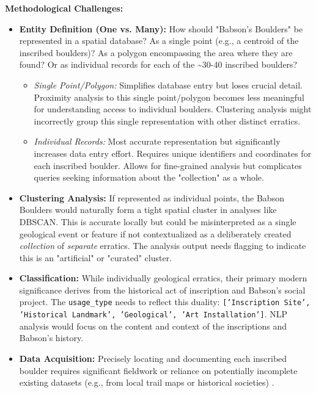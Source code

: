 \textbf{Methodological Challenges:}
\begin{itemize}
    \item \textbf{Entity Definition (One vs. Many):} How should "Babson's Boulders" be represented in a spatial database? As a single point (e.g., a centroid of the inscribed boulders)? As a polygon encompassing the area where they are found? Or as individual records for each of the \textasciitilde30-40 inscribed boulders?
        \begin{itemize}
            \item \emph{Single Point/Polygon:} Simplifies database entry but loses crucial detail. Proximity analysis to this single point/polygon becomes less meaningful for understanding access to individual boulders. Clustering analysis might incorrectly group this single representation with other distinct erratics.
            \item \emph{Individual Records:} Most accurate representation but significantly increases data entry effort. Requires unique identifiers and coordinates for each inscribed boulder. Allows for fine-grained analysis but complicates queries seeking information about the "collection" as a whole.
        \end{itemize}
    \item \textbf{Clustering Analysis:} If represented as individual points, the Babson Boulders would naturally form a tight spatial cluster in analyses like DBSCAN. This is accurate locally but could be misinterpreted as a single geological event or feature if not contextualized as a deliberately created \emph{collection} of \emph{separate} erratics. The analysis output needs flagging to indicate this is an "artificial" or "curated" cluster.
    \item \textbf{Classification:} While individually geological erratics, their primary modern significance derives from the historical act of inscription and Babson's social project. The \texttt{usage\_type} needs to reflect this duality: \texttt{['Inscription Site', 'Historical Landmark', 'Geological', 'Art Installation']}. NLP analysis would focus on the content and context of the inscriptions and Babson's history.
    \item \textbf{Data Acquisition:} Precisely locating and documenting each inscribed boulder requires significant fieldwork or reliance on potentially incomplete existing datasets (e.g., from local trail maps or historical societies) \cite{wburMysteriousBoulders}.
\end{itemize}

